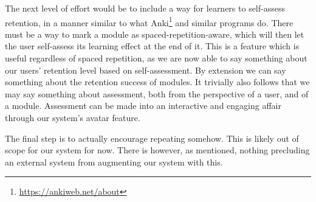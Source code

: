 The next level of effort would be to include a way for learners to self-assess 
retention, in a manner similar to what
Anki\footnote{\url{https://ankiweb.net/about}} and similar programs do. There 
must be a way to mark a module as spaced-repetition-aware, which will then let 
the user self-assess its learning effect at the end of it. This is a feature 
which is useful regardless of spaced repetition, as we are now able to say 
something about our users' retention level based on self-assessment. By 
extension we can say something about the retention success of modules. It 
trivially also follows that we may say something about assessment, both from 
the perspective of a user, and of a module. Assessment can be made into an 
interactive and engaging affair through our system's avatar 
feature\cite{berntsen2015enabling}.

The final step is to actually encourage repeating somehow. This is likely out 
of scope for our system for now. There is however, as mentioned, nothing 
precluding an external system from augmenting our system with this.
